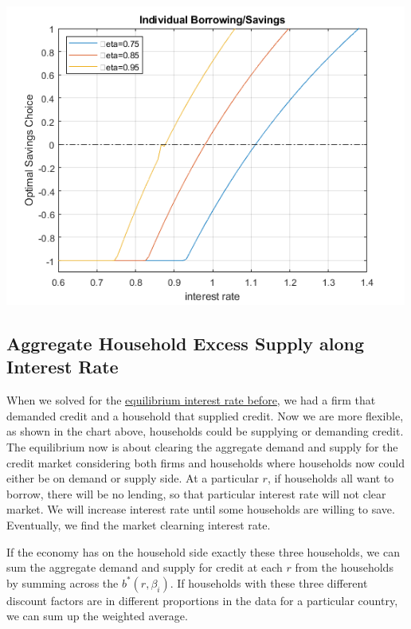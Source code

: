\documentclass[
]{book}
\begin{document}
\includegraphics[width=5.20833in,height=\textheight]{img/equilibrium_constrainedborrow_images/figure_0.png}

\hypertarget{aggregate-household-excess-supply-along-interest-rate}{%
\subsection{Aggregate Household Excess Supply along Interest Rate}\label{aggregate-household-excess-supply-along-interest-rate}}

When we solved for the \href{https://fanwangecon.github.io/Math4Econ/matrix_application/demand_supply_taylor_approximate_capital.html}{equilibrium interest rate
before},
we had a firm that demanded credit and a household that supplied credit.
Now we are more flexible, as shown in the chart above, households could
be supplying or demanding credit. The equilibrium now is about clearing
the aggregate demand and supply for the credit market considering both
firms and households where households now could either be on demand or
supply side. At a particular \(r\), if households all want to borrow,
there will be no lending, so that particular interest rate will not
clear market. We will increase interest rate until some households are
willing to save. Eventually, we find the market clearning interest rate.

If the economy has on the household side exactly these three households,
we can sum the aggregate demand and supply for credit at each \(r\) from
the households by summing across the \(b^* (r,\beta_i )\). If households
with these three different discount factors are in different proportions
in the data for a particular country, we can sum up the weighted
average.
\end{document}
